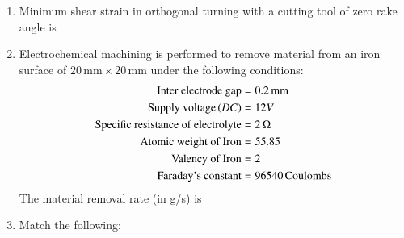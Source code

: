 \documentclass[journal]{IEEEtran}
\begin{document}
\begin{enumerate}
\begin{enumerate}
\end{enumerate}
\item Minimum shear strain in orthogonal turning with a cutting tool of zero rake angle is  
\begin{enumerate}
\end{enumerate}
\item Electrochemical machining is performed to remove material from an iron surface of $20 \, \text{mm} \times 20 \, \text{mm}$ under the following conditions:
	\begin{align}
		\text{Inter electrode gap} &= 0.2 \, \text{mm} \\
		\text{Supply voltage} \left(DC\right) & =12V \\
		\text{Specific resistance of electrolyte} &= 2 \, \Omega \\
		\text{Atomic weight of Iron} &= 55.85 \\
		\text{Valency of Iron} &=2 \\
		\text{Faraday's constant} &= 96540 \,\text{Coulombs}
	\end{align}
		The material removal rate (in g/s) is
\begin{enumerate}
\end{enumerate}
\item Match the following:
\begin{table}[h!]
        \centering
  
\end{table}	
	
\begin{enumerate}
\end{enumerate}
\end{enumerate}
\end{document}
